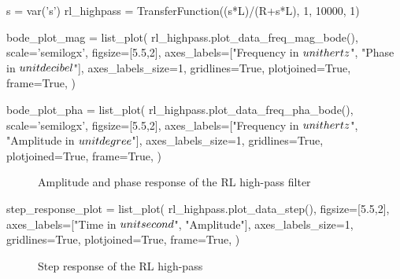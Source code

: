 \begin{sagesilent}
    s = var('s')
    rl_highpass = TransferFunction((s*L)/(R+s*L), 1, 10000, 1)

    bode_plot_mag = list_plot(
        rl_highpass.plot_data_freq_mag_bode(),
        scale='semilogx',
        figsize=[5.5,2],
        axes_labels=["Frequency in $\\unit{\\hertz}$", "Phase in $\\unit{\\decibel}$"],
        axes_labels_size=1,
        gridlines=True,
        plotjoined=True,
        frame=True,
    )

    bode_plot_pha = list_plot(
        rl_highpass.plot_data_freq_pha_bode(),
        scale='semilogx',
        figsize=[5.5,2],
        axes_labels=["Frequency in $\\unit{\\hertz}$", "Amplitude in $\\unit{\\degree}$"],
        axes_labels_size=1,
        gridlines=True,
        plotjoined=True,
        frame=True,
    )
\end{sagesilent}

\begin{figure}[H]
    \centering
    \begin{subfigure}{\textwidth}
        \centering
    \end{subfigure}
    \quad
    \begin{subfigure}{\textwidth}
        \centering
    \end{subfigure}
    \caption{Amplitude and phase response of the RL high-pass filter}
\end{figure}

\begin{sagesilent}
    step_response_plot = list_plot(
        rl_highpass.plot_data_step(),
        figsize=[5.5,2],
        axes_labels=["Time in $\\unit{\\second}$", "Amplitude"],
        axes_labels_size=1,
        gridlines=True,
        plotjoined=True,
        frame=True,
    )
\end{sagesilent}

\begin{figure}[H]
    \centering
    \caption{Step response of the RL high-pass}
\end{figure}

